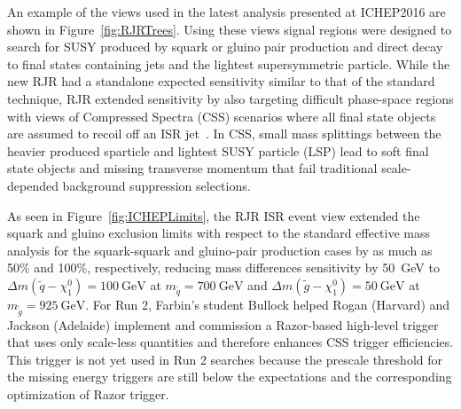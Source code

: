 An example of the views used in the latest analysis presented at
ICHEP2016 are shown in Figure~\ref{fig:RJRTrees}.  Using these views
signal regions were designed to search for SUSY produced by squark or
gluino pair production and direct decay to final states containing
jets and the lightest supersymmetric particle. While the new RJR had a
standalone expected sensitivity similar to that of the standard
technique, RJR extended sensitivity by also targeting difficult
phase-space regions with views of Compressed Spectra (CSS) scenarios
where all final state objects are assumed to recoil off an ISR
jet~\cite{Jackson:2016mfb}. In CSS, small mass splittings between the
heavier produced sparticle and lightest SUSY particle (LSP) lead to
soft final state objects and missing transverse momentum that fail
traditional scale-depended background suppression selections. 

As seen in Figure~\ref{fig:ICHEPLimits}, the RJR ISR event view
extended the squark and gluino exclusion limits with respect to the
standard effective mass analysis for the squark-squark and gluino-pair
production cases by as much as 50\% and 100\%, respectively, reducing
mass differences sensitivity by 50~GeV to $\Delta m(\tilde{q} -
\chi_1^0) = 100~\mathrm{GeV}$ at $m_{\tilde{q}} = 700~\mathrm{GeV}$  and 
$\Delta m(\tilde{g} -\chi_1^0) = 50~\mathrm{GeV}$ at $m_{\tilde{g}} =
925~\mathrm{GeV}$. For Run 2, Farbin's student Bullock helped Rogan
(Harvard) and Jackson (Adelaide) implement and commission a
Razor-based high-level trigger that uses only scale-less quantities
and therefore enhances CSS trigger efficiencies. This trigger is not
yet used in Run 2 searches because the prescale threshold for the
missing energy triggers are still below the expectations and the
corresponding optimization of Razor trigger.

